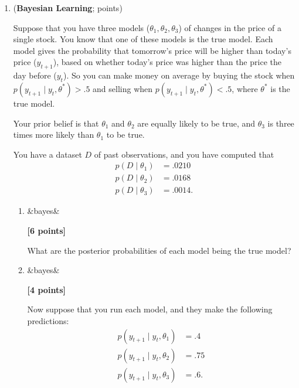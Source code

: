 \documentclass{article}
\newcounter{totalpoints}
\newcommand{\question}[2][]{(\textbf{#2}; \subtotal{#1})}
\newcommand{\subtotal}[1]{\newcounter{#1}\setcounter{#1}{0}\regtotcounter{#1}\total{#1} points}
\newcommand{\points}[2][]{{\addtocounter{totalpoints}{#2}\ifx&#1&\else\addtocounter{#1}{#2}\fi\textbf{[#2 points]}}}
\begin{document}
\begin{enumerate}
\begin{enumerate}
\item \points[neural]{10}
Did one of your implementations perform substantially better on one of the test sets than the other implementation did?
If so, why?  If not, why not?
\begin{answer}{1.5in}
\end{answer}


\end{enumerate}





\item \question[bayes]{Bayesian Learning}

Suppose that you have three models ($\theta_1,\theta_2,\theta_3$) of changes in the price of a single stock.
You know that one of these models is the true model.  Each model gives the probability that tomorrow's price will be higher than today's price ($y_{t+1}$), based on whether today's price was higher than the price the day before ($y_t$).  So you can make money on average by buying the stock when $p(y_{t+1} \mid y_t, \theta^*) > .5$ and selling when $p(y_{t+1} \mid y_t, \theta^*) < .5$, where $\theta^*$ is the true model.

Your prior belief is that $\theta_1$ and $\theta_2$ are equally likely to be true, and $\theta_3$ is three times more likely than $\theta_1$ to be true.

You have a dataset $D$ of past observations, and you have computed that
\begin{align*}
p(D \mid \theta_1) &= .0210 \\
p(D \mid \theta_2) &= .0168 \\
p(D \mid \theta_3) &= .0014.
\end{align*}

\begin{enumerate}
\item \points[bayes]{6}
What are the posterior probabilities of each model being the true model?
\begin{answer}{1.5in}
\end{answer}

\clearpage
\item \points[bayes]{4}
Now suppose that you run each model, and they make the following predictions:
\begin{align*}
p(y_{t+1} \mid y_t, \theta_1) &= .4 \\
p(y_{t+1} \mid y_t, \theta_2) &= .75 \\
p(y_{t+1} \mid y_t, \theta_3) &= .6.
\end{align*}


\end{enumerate}
\end{enumerate}
\end{document}
